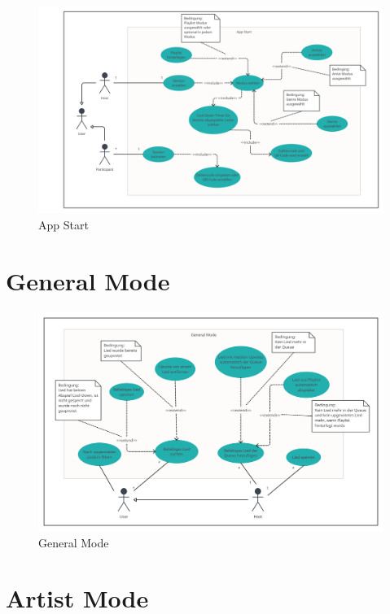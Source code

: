 \documentclass[oneside, ngerman]{sdqtechreport}
\begin{document}
\begin{figure}[h]
    \includegraphics[width = 18cm]{LATEX/Pflichtenheft/GraphicDesigns/Use Case App Start.png}
    \caption{App Start}
    \label{fig:Use Case App Start}
\end{figure}

\newpage

\section{General Mode}
\label{sec:Anwendungsfälle:General Mode}

\begin{figure}[h]
    \includegraphics[width = 18cm]{LATEX/Pflichtenheft/GraphicDesigns/Use Case General Mode.png}
    \caption{General Mode}
    \label{fig:Use Case General Mode}
\end{figure}

\newpage

\section{Artist Mode}
\label{sec:Anwendungsfälle:Artist Mode}
\end{document}
